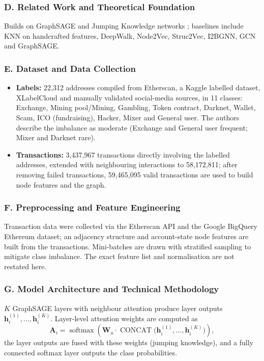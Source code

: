 \documentclass[11pt,a4paper]{article}
\begin{document}
\subsubsection*{D. Related Work and Theoretical Foundation}
Builds on GraphSAGE \cite{hamilton2017sage} and Jumping Knowledge networks \cite{xu2018jk}; baselines include KNN on handcrafted features, DeepWalk, Node2Vec, Struc2Vec, I2BGNN, GCN and GraphSAGE.

\subsubsection*{E. Dataset and Data Collection}
\begin{itemize}[leftmargin=*]
    \item \textbf{Labels:} 22,312 addresses compiled from Etherscan, a Kaggle labelled dataset, XLabelCloud and manually validated social-media sources, in 11 classes: Exchange, Mining pool/Mining, Gambling, Token contract, Darknet, Wallet, Scam, ICO (fundraising), Hacker, Mixer and General user. The authors describe the imbalance as moderate (Exchange and General user frequent; Mixer and Darknet rare).
    \item \textbf{Transactions:} 3,437,967 transactions directly involving the labelled addresses, extended with neighbouring interactions to 58,172,811; after removing failed transactions, 59,465,095 valid transactions are used to build node features and the graph.
\end{itemize}

\subsubsection*{F. Preprocessing and Feature Engineering}
Transaction data were collected via the Etherscan API and the Google BigQuery Ethereum dataset; an adjacency structure and account-state node features are built from the transactions. Mini-batches are drawn with stratified sampling to mitigate class imbalance. The exact feature list and normalisation are not restated here.

\subsubsection*{G. Model Architecture and Technical Methodology}
$K$ GraphSAGE layers with neighbour attention produce layer outputs $\mathbf{h}_i^{(1)},\dots,\mathbf{h}_i^{(K)}$. Layer-level attention weights are computed as
\begin{equation}
    \mathbf{A}_i = \operatorname{softmax}\!\left(\mathbf{W}_a \cdot \operatorname{CONCAT}\big(\mathbf{h}_i^{(1)}, \dots, \mathbf{h}_i^{(K)}\big)\right),
\end{equation}
the layer outputs are fused with these weights (jumping knowledge), and a fully connected softmax layer outputs the class probabilities.
\end{document}
